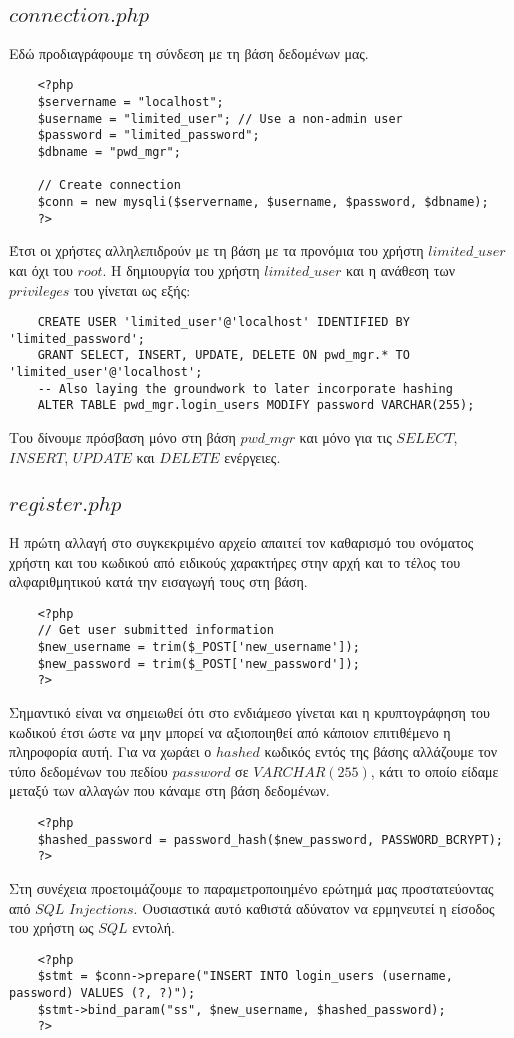 \documentclass{report}
\begin{document}
\subsection*{$connection.php$}
Εδώ προδιαγράφουμε τη σύνδεση με τη βάση δεδομένων μας. 
\begin{verbatim}
    <?php
    $servername = "localhost";
    $username = "limited_user"; // Use a non-admin user
    $password = "limited_password";
    $dbname = "pwd_mgr";

    // Create connection
    $conn = new mysqli($servername, $username, $password, $dbname);
    ?>
\end{verbatim}
Έτσι οι χρήστες αλληλεπιδρούν με τη βάση με τα προνόμια του χρήστη $limited\_user$ και όχι του $root$. 
Η δημιουργία του χρήστη $limited\_user$ και η ανάθεση των $privileges$ του γίνεται ως εξής:
\begin{verbatim}
    CREATE USER 'limited_user'@'localhost' IDENTIFIED BY 'limited_password';
    GRANT SELECT, INSERT, UPDATE, DELETE ON pwd_mgr.* TO 'limited_user'@'localhost';
    -- Also laying the groundwork to later incorporate hashing
    ALTER TABLE pwd_mgr.login_users MODIFY password VARCHAR(255);
\end{verbatim}
Του δίνουμε πρόσβαση μόνο στη βάση $pwd\_mgr$ και μόνο για τις $SELECT$, $INSERT$, $UPDATE$ και 
$DELETE$ ενέργειες.
\subsection*{$register.php$}
Η πρώτη αλλαγή στο συγκεκριμένο αρχείο απαιτεί τον καθαρισμό του ονόματος χρήστη και του κωδικού
από ειδικούς χαρακτήρες στην αρχή και το τέλος του αλφαριθμητικού κατά την εισαγωγή τους στη βάση.
\begin{verbatim}
    <?php
    // Get user submitted information
    $new_username = trim($_POST['new_username']);
    $new_password = trim($_POST['new_password']);
    ?>
\end{verbatim}
Σημαντικό είναι να σημειωθεί ότι στο ενδιάμεσο γίνεται και η κρυπτογράφηση του κωδικού έτσι ώστε να 
μην μπορεί να αξιοποιηθεί από κάποιον επιτιθέμενο η πληροφορία αυτή. Για να χωράει ο $hashed$ κωδικός
εντός της βάσης αλλάζουμε τον τύπο δεδομένων του πεδίου $password$ σε $VARCHAR(255)$, κάτι το οποίο 
είδαμε μεταξύ των αλλαγών που κάναμε στη βάση δεδομένων.
\begin{verbatim}
    <?php
    $hashed_password = password_hash($new_password, PASSWORD_BCRYPT);
    ?>
\end{verbatim}
Στη συνέχεια προετοιμάζουμε το παραμετροποιημένο ερώτημά μας προστατεύοντας από $SQL$ $Injections$. 
Ουσιαστικά αυτό καθιστά αδύνατον να ερμηνευτεί η είσοδος του χρήστη ως $SQL$ εντολή.
\begin{verbatim}
    <?php
    $stmt = $conn->prepare("INSERT INTO login_users (username, password) VALUES (?, ?)");
    $stmt->bind_param("ss", $new_username, $hashed_password);
    ?>
\end{verbatim}
\end{document}
